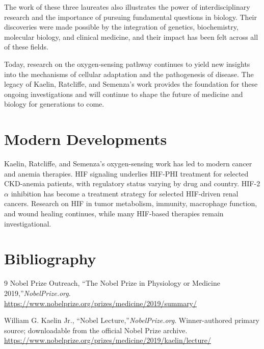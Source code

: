 The work of these three laureates also illustrates the power of interdisciplinary research and the importance of pursuing fundamental questions in biology. Their discoveries were made possible by the integration of genetics, biochemistry, molecular biology, and clinical medicine, and their impact has been felt across all of these fields.

Today, research on the oxygen-sensing pathway continues to yield new insights into the mechanisms of cellular adaptation and the pathogenesis of disease. The legacy of Kaelin, Ratcliffe, and Semenza's work provides the foundation for these ongoing investigations and will continue to shape the future of medicine and biology for generations to come.


\section{Modern Developments}

Kaelin, Ratcliffe, and Semenza's oxygen-sensing work has led to modern cancer and anemia therapies. HIF signaling underlies HIF-PHI treatment for selected CKD-anemia patients, with regulatory status varying by drug and country. HIF-2$\alpha$ inhibition has become a treatment strategy for selected HIF-driven renal cancers. Research on HIF in tumor metabolism, immunity, macrophage function, and wound healing continues, while many HIF-based therapies remain investigational.


\section{Bibliography}

\begin{thebibliography}{9}
Nobel Prize Outreach, ``The Nobel Prize in Physiology or Medicine 2019,''\emph{NobelPrize.org}.\\
\url{https://www.nobelprize.org/prizes/medicine/2019/summary/}

William G. Kaelin Jr., ``Nobel Lecture,''\emph{NobelPrize.org}. Winner-authored primary source; downloadable from the official Nobel Prize archive.\\
\url{https://www.nobelprize.org/prizes/medicine/2019/kaelin/lecture/}
\end{thebibliography}

